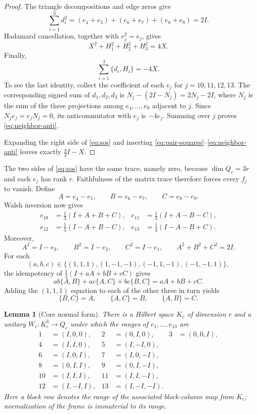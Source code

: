 \documentclass[11pt]{article}
\newtheorem{lemma}[theorem]{Lemma}
\begin{document}
\begin{proof}
The triangle decompositions and edge zeros give
\begin{equation}\label{eq:pair-squares}
 \sum_{i=1}^3d_i^2
  =(e_4+e_5)+(e_6+e_7)+(e_8+e_9)=2I.
\end{equation}
Hadamard cancellation, together with $e_j^2=e_j$, gives
\begin{equation}\label{eq:walsh-squares}
       X^2+H_1^2+H_2^2+H_3^2=4X.
\end{equation}
Finally,
\begin{equation}\label{eq:neighbor-anti}
       \sum_{i=1}^3\{d_i,H_i\}=-4X.
\end{equation}
To see the last identity, collect the coefficient of each $e_j$ for
$j=10,11,12,13$.  The corresponding signed sum of $d_1,d_2,d_3$ is
$N_j-(2I-N_j)=2N_j-2I$, where $N_j$ is the sum of the three projections among
$e_4,\ldots,e_9$ adjacent to $j$.  Since $N_je_j=e_jN_j=0$, its
anticommutator with $e_j$ is $-4e_j$.  Summing over $j$ proves
\eqref{eq:neighbor-anti}.

Expanding the right side of \eqref{eq:sos} and inserting
\eqref{eq:pair-squares}--\eqref{eq:neighbor-anti} leaves exactly
$\frac43I-X$.
\end{proof}

The two sides of \eqref{eq:sos} have the same trace, namely zero, because
$\dim Q_c=3r$ and each $e_j$ has rank $r$.  Faithfulness of the matrix trace
therefore forces every $f_j$ to vanish.  Define
\[
       A=e_4-e_5,\qquad B=e_6-e_7,\qquad C=e_8-e_9.
\]
Walsh inversion now gives
\begin{align}
e_{10}&=\tfrac13(I+A+B+C),&
e_{11}&=\tfrac13(I+A-B-C),\label{eq:walsh-inverse}\\
e_{12}&=\tfrac13(I-A+B-C),&
e_{13}&=\tfrac13(I-A-B+C).\nonumber
\end{align}
Moreover,
\[
 A^2=I-e_3,\qquad B^2=I-e_2,\qquad C^2=I-e_1,\qquad
 A^2+B^2+C^2=2I.
\]
For each
\[
 (a,b,c)\in\{(1,1,1),(1,-1,-1),(-1,1,-1),(-1,-1,1)\},
\]
the idempotency of $\frac13(I+aA+bB+cC)$ gives
\[
 ab\{A,B\}+ac\{A,C\}+bc\{B,C\}=aA+bB+cC.
\]
Adding the $(1,1,1)$ equation to each of the other three in turn yields
\begin{equation}\label{eq:anticommutators}
        \{B,C\}=A,\qquad \{A,C\}=B,\qquad \{A,B\}=C.
\end{equation}

\begin{lemma}[Core normal form]\label{lem:core}
There is a Hilbert space $K_c$ of dimension $r$ and a unitary
$W_c:K_c^3\to Q_c$ under which the ranges of $e_1,\ldots,e_{13}$ are
\begin{align*}
1&=(I,0,0),&2&=(0,I,0),&3&=(0,0,I),\\
4&=(I,I,0),&5&=(I,-I,0),\\
6&=(I,0,I),&7&=(I,0,-I),\\
8&=(0,I,I),&9&=(0,I,-I),\\
10&=(I,I,I),&11&=(I,I,-I),\\
12&=(I,-I,I),&13&=(I,-I,-I).
\end{align*}
Here a block row denotes the range of the associated block-column map from
$K_c$; normalization of the frame is immaterial to its range.
\end{lemma}
\end{document}
